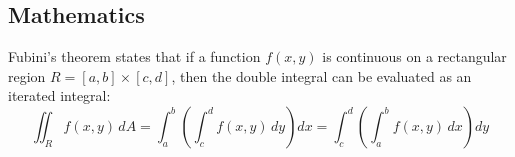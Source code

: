 \subsection{Mathematics}
Fubini's theorem states that if a function $f(x, y)$ is continuous on a rectangular region $R = [a, b] \times [c, d]$, then the double integral can be evaluated as an iterated integral:
\begin{equation} \label{eq:fubini}
\iint_R f(x,y) \, dA = \int_a^b \left( \int_c^d f(x,y) \, dy \right) dx = \int_c^d \left( \int_a^b f(x,y) \, dx \right) dy
\end{equation}
